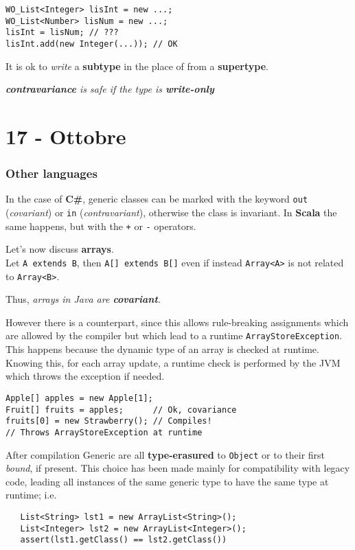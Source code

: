 \begin{lstlisting}
WO_List<Integer> lisInt = new ...;
WO_List<Number> lisNum = new ...;
lisInt = lisNum; // ???
lisInt.add(new Integer(...)); // OK
\end{lstlisting}
It is ok to \textit{write} a \textbf{subtype} in the place of from a \textbf{supertype}.
\begin{center}
   \textit{\textbf{contravariance} is safe if the type is \textbf{write-only}}
\end{center}
\section*{17 - Ottobre}
\subsubsection*{Other languages}
In the case of \textbf{C\#}, generic classes can be marked with the keyword \lstinline|out| (\textit{covariant}) or \lstinline|in| (\textit{contravariant}),
otherwise the class is invariant.
In \textbf{Scala} the same happens,
but with the \lstinline|+| or \lstinline|-| operators.\nl

Let's now discuss \textbf{arrays}.\\
Let \lstinline|A extends B|, then \lstinline|A[] extends B[]| even if instead \lstinline|Array<A>| is not related to \lstinline|Array<B>|.
\begin{center}
   Thus, \textit{arrays in Java are \textbf{covariant}.}
\end{center}

However there is a counterpart, since this allows rule-breaking assignments
which are allowed by the compiler but which lead to a runtime \lstinline|ArrayStoreException|.
This happens because the dynamic type of an array is checked at runtime.
Knowing this, for each array update, a runtime check is performed by the JVM which throws the exception if needed.
\begin{lstlisting}
Apple[] apples = new Apple[1];
Fruit[] fruits = apples;      // Ok, covariance
fruits[0] = new Strawberry(); // Compiles!
// Throws ArrayStoreException at runtime
\end{lstlisting}

After compilation Generic are all \textbf{type-erasured} to \lstinline|Object| or to their first \textit{bound}, if present.
This choice has been made mainly for compatibility with legacy code, leading all instances of the same generic type to have the same type at runtime; 
i.e.
\begin{lstlisting}
   List<String> lst1 = new ArrayList<String>();
   List<Integer> lst2 = new ArrayList<Integer>();
   assert(lst1.getClass() == lst2.getClass())   
\end{lstlisting}

